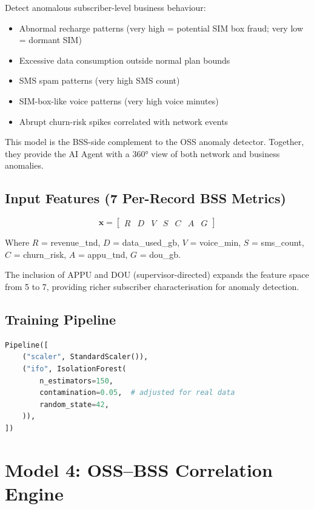 Detect anomalous subscriber-level business behaviour:
\begin{itemize}
  \item Abnormal recharge patterns (very high = potential SIM box fraud; very low = dormant SIM)
  \item Excessive data consumption outside normal plan bounds
  \item SMS spam patterns (very high SMS count)
  \item SIM-box-like voice patterns (very high voice minutes)
  \item Abrupt churn-risk spikes correlated with network events
\end{itemize}

This model is the BSS-side complement to the OSS anomaly detector. Together, they provide the AI Agent with a 360° view of both network and business anomalies.

\subsection{Input Features (7 Per-Record BSS Metrics)}

$$\mathbf{x} = \begin{bmatrix} R & D & V & S & C & A & G \end{bmatrix}$$

Where $R$ = revenue\_tnd, $D$ = data\_used\_gb, $V$ = voice\_min, $S$ = sms\_count, $C$ = churn\_risk, $A$ = appu\_tnd, $G$ = dou\_gb.

The inclusion of APPU and DOU (supervisor-directed) expands the feature space from 5 to 7, providing richer subscriber characterisation for anomaly detection.

\subsection{Training Pipeline}

\begin{lstlisting}[language=Python, caption={BSS Revenue Anomaly model training pipeline.}]
Pipeline([
    ("scaler", StandardScaler()),
    ("ifo", IsolationForest(
        n_estimators=150,
        contamination=0.05,  # adjusted for real data
        random_state=42,
    )),
])
\end{lstlisting}

\section{Model 4: OSS--BSS Correlation Engine}

